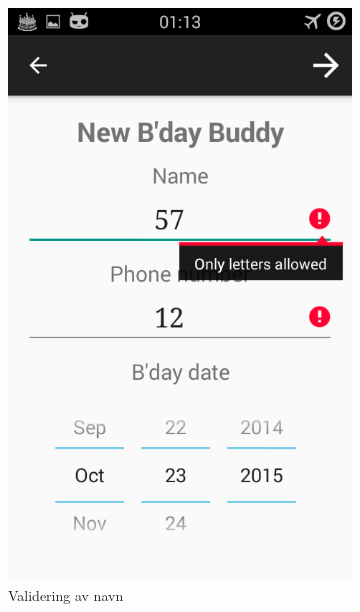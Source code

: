 \begin{figure}[ht]
    \centering
    \begin{subfigure}[b]{0.35\textwidth}
        \includegraphics[width=\textwidth]{./img/15.png}
        \caption{Validering av navn}
        \label{fig:validering_tekst}
    \end{subfigure}
    \begin{subfigure}[b]{0.35\textwidth}

\end{subfigure}
\end{figure}
